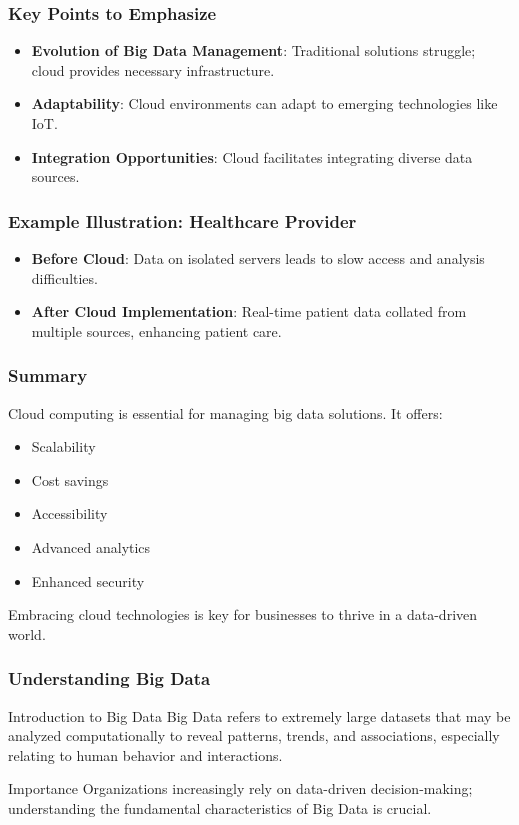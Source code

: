 \documentclass[aspectratio=169]{beamer}
\begin{document}
\begin{frame}[fragile]
    \frametitle{Key Points to Emphasize}
    \begin{itemize}
        \item \textbf{Evolution of Big Data Management}: Traditional solutions struggle; cloud provides necessary infrastructure.
        \item \textbf{Adaptability}: Cloud environments can adapt to emerging technologies like IoT.
        \item \textbf{Integration Opportunities}: Cloud facilitates integrating diverse data sources.
    \end{itemize}
\end{frame}

\begin{frame}[fragile]
    \frametitle{Example Illustration: Healthcare Provider}
    \begin{itemize}
        \item \textbf{Before Cloud}: Data on isolated servers leads to slow access and analysis difficulties.
        \item \textbf{After Cloud Implementation}: Real-time patient data collated from multiple sources, enhancing patient care.
    \end{itemize}
\end{frame}

\begin{frame}[fragile]
    \frametitle{Summary}
    Cloud computing is essential for managing big data solutions. It offers:
    \begin{itemize}
        \item Scalability
        \item Cost savings
        \item Accessibility
        \item Advanced analytics
        \item Enhanced security
    \end{itemize}
    Embracing cloud technologies is key for businesses to thrive in a data-driven world.
\end{frame}

\begin{frame}[fragile]
    \frametitle{Understanding Big Data}
    
    \begin{block}{Introduction to Big Data}
        Big Data refers to extremely large datasets that may be analyzed 
        computationally to reveal patterns, trends, and associations, especially 
        relating to human behavior and interactions.
    \end{block}
    
    \begin{block}{Importance}
        Organizations increasingly rely on data-driven decision-making; understanding 
        the fundamental characteristics of Big Data is crucial.
    \end{block}
\end{frame}
\end{document}

